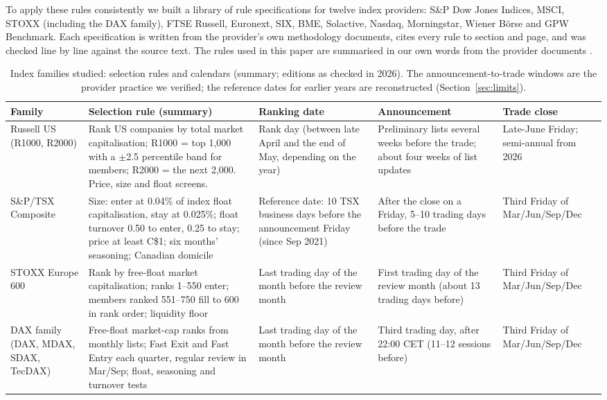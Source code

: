 \documentclass[10pt, a4paper, twocolumn]{article}
\renewcommand{\toprule}{\arrayrulecolor{qnavy}\specialrule{\heavyrulewidth}{\abovetopsep}{\belowrulesep}\arrayrulecolor{black}}
\newcommand{\qstripes}{\rowcolors{2}{qstripe}{white}}
\newcommand{\qhead}[1]{\textbf{\color{qnavy}#1}}
\begin{document}
To apply these rules consistently we built a library of rule specifications for twelve index providers: S\&P Dow Jones Indices, MSCI, STOXX (including the DAX family), FTSE Russell, Euronext, SIX, BME, Solactive, Nasdaq, Morningstar, Wiener B\"orse and GPW Benchmark. Each specification is written from the provider's own methodology documents, cites every rule to section and page, and was checked line by line against the source text. The rules used in this paper are summarised in our own words from the provider documents \cite{spdji,stoxx,dax,msci,russell}.

\begin{table}[t]
\centering
\caption{Index families studied: selection rules and calendars (summary; editions as checked in 2026). The announcement-to-trade windows are the provider practice we verified; the reference dates for earlier years are reconstructed (Section~\ref{sec:limits}).}
\label{tab:rules}
\footnotesize
\qstripes
\begin{tabularx}{\textwidth}{@{}P{2.3cm}LP{3.3cm}P{3.1cm}P{2.6cm}@{}}
\toprule
\qhead{Family} & \qhead{Selection rule (summary)} & \qhead{Ranking date} & \qhead{Announcement} & \qhead{Trade close} \\
\midrule
Russell US (R1000, R2000) & Rank US companies by total market capitalisation; R1000 = top 1,000 with a $\pm$2.5 percentile band for members; R2000 = the next 2,000. Price, size and float screens. & Rank day (between late April and the end of May, depending on the year) & Preliminary lists several weeks before the trade; about four weeks of list updates & Late-June Friday; semi-annual from 2026 \\
S\&P/TSX Composite & Size: enter at 0.04\% of index float capitalisation, stay at 0.025\%; float turnover 0.50 to enter, 0.25 to stay; price at least C\$1; six months' seasoning; Canadian domicile & Reference date: 10 TSX business days before the announcement Friday (since Sep 2021) & After the close on a Friday, 5--10 trading days before the trade & Third Friday of Mar/Jun/Sep/Dec \\
STOXX Europe 600 & Rank by free-float market capitalisation; ranks 1--550 enter; members ranked 551--750 fill to 600 in rank order; liquidity floor & Last trading day of the month before the review month & First trading day of the review month (about 13 trading days before) & Third Friday of Mar/Jun/Sep/Dec \\
DAX family (DAX, MDAX, SDAX, TecDAX) & Free-float market-cap ranks from monthly lists; Fast Exit and Fast Entry each quarter, regular review in Mar/Sep; float, seasoning and turnover tests & Last trading day of the month before the review month & Third trading day, after 22:00 CET (11--12 sessions before) & Third Friday of Mar/Jun/Sep/Dec \\

\end{tabularx}
\end{table}
\end{document}
